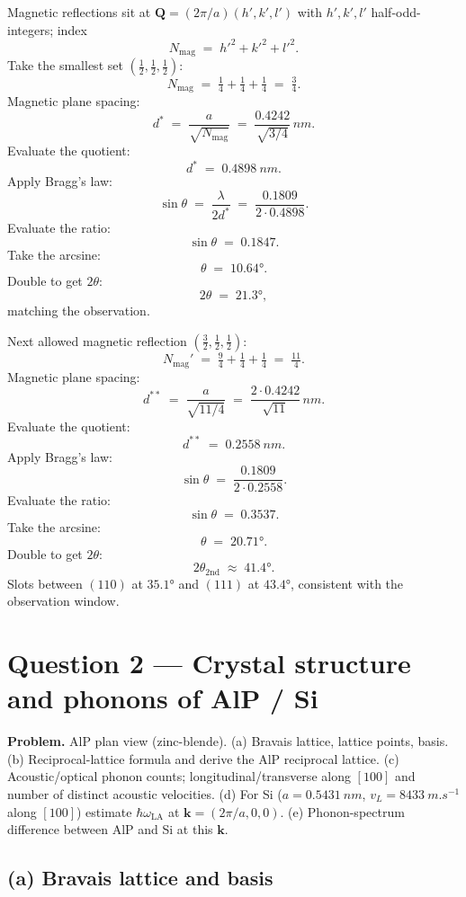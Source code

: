 \documentclass[11pt]{article}
\begin{document}
Magnetic reflections sit at $\bm Q=(2\pi/a)(h',k',l')$ with $h',k',l'$ half-odd-integers; index
\[
N_{\text{mag}} \;=\; h'^2+k'^2+l'^2.
\]
Take the smallest set $(\tfrac12,\tfrac12,\tfrac12)$:
\[
N_{\text{mag}} \;=\; \tfrac14+\tfrac14+\tfrac14 \;=\; \tfrac34.
\]
Magnetic plane spacing:
\[
d^{*} \;=\; \frac{a}{\sqrt{N_{\text{mag}}}} \;=\; \frac{0.4242}{\sqrt{3/4}}\,\si{nm}.
\]
Evaluate the quotient:
\[
d^{*} \;=\; \SI{0.4898}{nm}.
\]
Apply Bragg's law:
\[
\sin\theta \;=\; \frac{\lambda}{2 d^{*}} \;=\; \frac{0.1809}{2\cdot 0.4898}.
\]
Evaluate the ratio:
\[
\sin\theta \;=\; 0.1847.
\]
Take the arcsine:
\[
\theta \;=\; \ang{10.64}.
\]
Double to get $2\theta$:
\[
2\theta \;=\; \ang{21.3},
\]
matching the observation.

Next allowed magnetic reflection $(\tfrac32,\tfrac12,\tfrac12)$:
\[
N_{\text{mag}}' \;=\; \tfrac94+\tfrac14+\tfrac14 \;=\; \tfrac{11}{4}.
\]
Magnetic plane spacing:
\[
d^{**} \;=\; \frac{a}{\sqrt{11/4}} \;=\; \frac{2\cdot 0.4242}{\sqrt{11}}\,\si{nm}.
\]
Evaluate the quotient:
\[
d^{**} \;=\; \SI{0.2558}{nm}.
\]
Apply Bragg's law:
\[
\sin\theta \;=\; \frac{0.1809}{2\cdot 0.2558}.
\]
Evaluate the ratio:
\[
\sin\theta \;=\; 0.3537.
\]
Take the arcsine:
\[
\theta \;=\; \ang{20.71}.
\]
Double to get $2\theta$:
\begin{equation}
\boxed{\;2\theta_{\text{2nd}} \;\approx\; \ang{41.4}.\;}
\label{eq:secondring}
\end{equation}
Slots between $(110)$ at $\ang{35.1}$ and $(111)$ at $\ang{43.4}$, consistent with the observation window.

\section*{Question 2 --- Crystal structure and phonons of AlP / Si}

\textbf{Problem.} AlP plan view (zinc-blende). (a) Bravais lattice, lattice points, basis. (b) Reciprocal-lattice formula and derive the AlP reciprocal lattice. (c) Acoustic/optical phonon counts; longitudinal/transverse along $[100]$ and number of distinct acoustic velocities. (d) For Si ($a=\SI{0.5431}{nm}$, $v_L=\SI{8433}{m.s^{-1}}$ along $[100]$) estimate $\hbar\omega_{\text{LA}}$ at $\bm k=(2\pi/a,0,0)$. (e) Phonon-spectrum difference between AlP and Si at this $\bm k$.

\subsection*{(a) Bravais lattice and basis}
\end{document}
